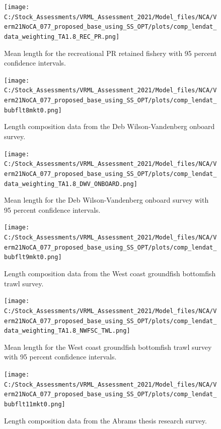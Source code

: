 \documentclass[11pt,
  english,
  a4paper,
]{article}
\begin{document}
\begin{figure}
\centering
\texttt{[image: C:/Stock\_Assessments/VRML\_Assessment\_2021/Model\_files/NCA/Verm21NoCA\_077\_proposed\_base\_using\_SS\_OPT/plots/comp\_lendat\_data\_weighting\_TA1.8\_REC\_PR.png]}
\caption{Mean length for the recreational PR retained fishery with 95 percent confidence intervals.\label{fig:mean-com-len-data-REC-PR}}
\end{figure}

\begin{figure}
\centering
\texttt{[image: C:/Stock\_Assessments/VRML\_Assessment\_2021/Model\_files/NCA/Verm21NoCA\_077\_proposed\_base\_using\_SS\_OPT/plots/comp\_lendat\_bubflt8mkt0.png]}
\caption{Length composition data from the Deb Wilson-Vandenberg onboard survey.\label{fig:len-data-DWV-ONBOARD}}
\end{figure}

\begin{figure}
\centering
\texttt{[image: C:/Stock\_Assessments/VRML\_Assessment\_2021/Model\_files/NCA/Verm21NoCA\_077\_proposed\_base\_using\_SS\_OPT/plots/comp\_lendat\_data\_weighting\_TA1.8\_DWV\_ONBOARD.png]}
\caption{Mean length for the Deb Wilson-Vandenberg onboard survey with 95 percent confidence intervals.\label{fig:mean-com-len-data-DWV-ONBOARD}}
\end{figure}

\begin{figure}
\centering
\texttt{[image: C:/Stock\_Assessments/VRML\_Assessment\_2021/Model\_files/NCA/Verm21NoCA\_077\_proposed\_base\_using\_SS\_OPT/plots/comp\_lendat\_bubflt9mkt0.png]}
\caption{Length composition data from the West coast groundfish bottomfish trawl survey.\label{fig:len-data-NWFSC-TWL}}
\end{figure}

\begin{figure}
\centering
\texttt{[image: C:/Stock\_Assessments/VRML\_Assessment\_2021/Model\_files/NCA/Verm21NoCA\_077\_proposed\_base\_using\_SS\_OPT/plots/comp\_lendat\_data\_weighting\_TA1.8\_NWFSC\_TWL.png]}
\caption{Mean length for the West coast groundfish bottomfish trawl survey with 95 percent confidence intervals.\label{fig:mean-com-len-data-NWFSC-TWL}}
\end{figure}

\begin{figure}
\centering
\texttt{[image: C:/Stock\_Assessments/VRML\_Assessment\_2021/Model\_files/NCA/Verm21NoCA\_077\_proposed\_base\_using\_SS\_OPT/plots/comp\_lendat\_bubflt11mkt0.png]}
\caption{Length composition data from the Abrams thesis research survey.\label{fig:len-data-ABRAMS-RESEARCH}}
\end{figure}
\end{document}
